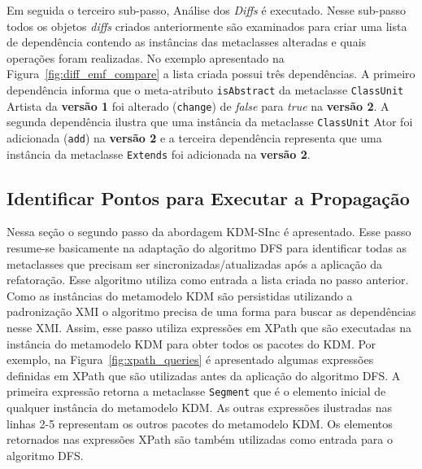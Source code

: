 

Em seguida o terceiro sub-passo, Análise dos \textit{Diffs} é executado. Nesse sub-passo todos os objetos \textit{diffs} criados anteriormente são examinados para criar uma lista de dependência contendo as instâncias das metaclasses alteradas e quais operações foram realizadas. No exemplo apresentado na Figura~\ref{fig:diff_emf_compare} a lista criada possui três dependências. A primeiro dependência informa que o meta-atributo \texttt{isAbstract} da metaclasse \texttt{ClassUnit} Artista da \textbf{versão 1} foi alterado (\texttt{change}) de \textit{false} para \textit{true} na \textbf{versão 2}. A segunda dependência ilustra que uma instância da metaclasse \texttt{ClassUnit} Ator foi adicionada (\texttt{add}) na \textbf{versão 2} e a terceira dependência representa que uma instância da metaclasse \texttt{Extends} foi adicionada na \textbf{versão 2}.


\subsection{Identificar Pontos para Executar a Propagação}\label{subsec:identificandoPontoParaExecutarApropagacao}

Nessa seção o segundo passo da abordagem KDM-SInc é apresentado. Esse passo resume-se basicamente na adaptação do algoritmo DFS para identificar todas as metaclasses que precisam ser sincronizadas/atualizadas após a aplicação da refatoração. Esse algoritmo utiliza como entrada a lista criada no passo anterior. Como as instâncias do metamodelo KDM são persistidas utilizando a padronização XMI o algoritmo precisa de uma forma para buscar as dependências nesse XMI. Assim, esse passo utiliza expressões em XPath que são executadas na instância do metamodelo KDM para obter todos os pacotes do KDM. Por exemplo, na Figura~\ref{fig:xpath_queries} é apresentado algumas expressões definidas em XPath que são utilizadas antes da aplicação do algoritmo DFS. A primeira expressão retorna a metaclasse \texttt{Segment} que é o elemento inicial de qualquer instância do metamodelo KDM. As outras expressões ilustradas nas linhas 2-5 representam os outros pacotes do metamodelo KDM. Os elementos retornados nas expressões XPath são também utilizadas como entrada para o algoritmo DFS.

